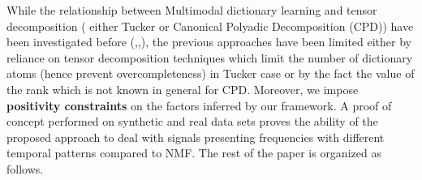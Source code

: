 \documentclass{article}
\begin{document}
While the relationship between Multimodal dictionary learning and tensor decomposition ( either Tucker or Canonical Polyadic Decomposition (CPD)) have been investigated before (\cite{OtherrefDictionaryImagedenoising},\cite{refTuckerChicochi},\cite{CPDictionary}), the previous approaches have been limited  either by reliance on tensor decomposition techniques which  limit the number of dictionary atoms (hence prevent overcompleteness) in Tucker case or by the fact the value of the rank which is not known in general for CPD. Moreover, we impose \textbf{positivity constraints} on the factors inferred by our framework.
A proof of concept performed on synthetic and real data sets proves the ability of the proposed approach to deal with signals presenting frequencies with different temporal patterns compared to NMF.
The rest of the paper is organized as follows. 
\end{document}
